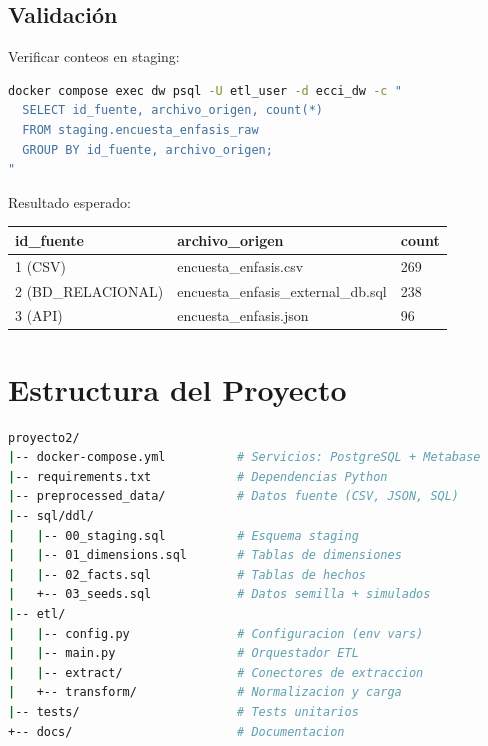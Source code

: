 \documentclass[12pt, letterpaper]{article}
\begin{document}
\subsection{Validación}

Verificar conteos en staging:
\begin{lstlisting}[language=bash]
docker compose exec dw psql -U etl_user -d ecci_dw -c "
  SELECT id_fuente, archivo_origen, count(*)
  FROM staging.encuesta_enfasis_raw
  GROUP BY id_fuente, archivo_origen;
"
\end{lstlisting}

Resultado esperado:
\begin{table}[H]
\centering
\begin{tabular}{lll}
\toprule
\textbf{id\_fuente} & \textbf{archivo\_origen} & \textbf{count} \\
\midrule
1 (CSV) & encuesta\_enfasis.csv & 269 \\
2 (BD\_RELACIONAL) & encuesta\_enfasis\_external\_db.sql & 238 \\
3 (API) & encuesta\_enfasis.json & 96 \\
\bottomrule
\end{tabular}
\end{table}

\section{Estructura del Proyecto}

\begin{lstlisting}[language=bash]
proyecto2/
|-- docker-compose.yml          # Servicios: PostgreSQL + Metabase
|-- requirements.txt            # Dependencias Python
|-- preprocessed_data/          # Datos fuente (CSV, JSON, SQL)
|-- sql/ddl/
|   |-- 00_staging.sql          # Esquema staging
|   |-- 01_dimensions.sql       # Tablas de dimensiones
|   |-- 02_facts.sql            # Tablas de hechos
|   +-- 03_seeds.sql            # Datos semilla + simulados
|-- etl/
|   |-- config.py               # Configuracion (env vars)
|   |-- main.py                 # Orquestador ETL
|   |-- extract/                # Conectores de extraccion
|   +-- transform/              # Normalizacion y carga
|-- tests/                      # Tests unitarios
+-- docs/                       # Documentacion
\end{lstlisting}
\end{document}

